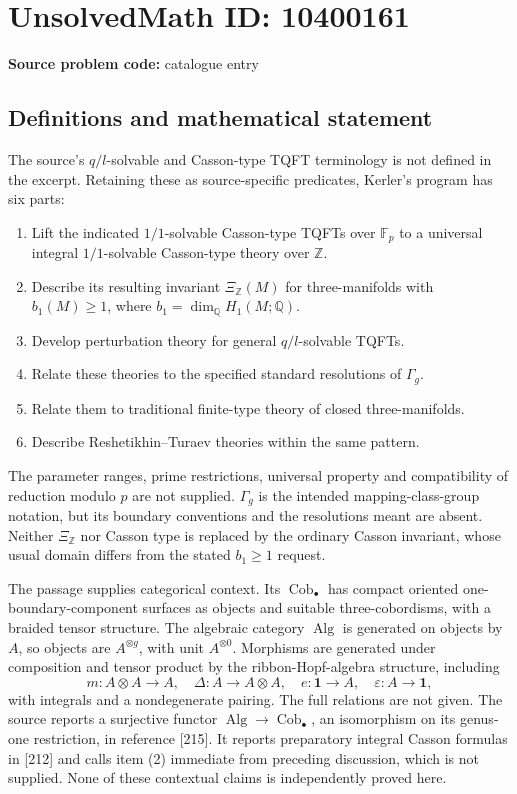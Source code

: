 \documentclass[11pt]{article}
\begin{document}
\section*{UnsolvedMath ID: 10400161}
\textbf{Source problem code:} catalogue entry
\subsection{Definitions and mathematical statement}
The source's \(q/l\)-solvable and Casson-type TQFT terminology is not defined in the excerpt. Retaining these as source-specific predicates, Kerler's program has six parts:
\begin{enumerate}
\item Lift the indicated \(1/1\)-solvable Casson-type TQFTs over \(\mathbb F_p\) to a universal integral \(1/1\)-solvable Casson-type theory over \(\mathbb Z\).
\item Describe its resulting invariant \(\Xi_{\mathbb Z}(M)\) for three-manifolds with \(b_1(M)\ge1\), where \(b_1=\dim_{\mathbb Q}H_1(M;\mathbb Q)\).
\item Develop perturbation theory for general \(q/l\)-solvable TQFTs.
\item Relate these theories to the specified standard resolutions of \(\Gamma_g\).
\item Relate them to traditional finite-type theory of closed three-manifolds.
\item Describe Reshetikhin--Turaev theories within the same pattern.
\end{enumerate}
The parameter ranges, prime restrictions, universal property and compatibility of reduction modulo \(p\) are not supplied. \(\Gamma_g\) is the intended mapping-class-group notation, but its boundary conventions and the resolutions meant are absent. Neither \(\Xi_{\mathbb Z}\) nor Casson type is replaced by the ordinary Casson invariant, whose usual domain differs from the stated \(b_1\ge1\) request.

The passage supplies categorical context. Its \(\operatorname{Cob}_\bullet\) has compact oriented one-boundary-component surfaces as objects and suitable three-cobordisms, with a braided tensor structure. The algebraic category \(\operatorname{Alg}\) is generated on objects by \(A\), so objects are \(A^{\otimes g}\), with unit \(A^{\otimes0}\). Morphisms are generated under composition and tensor product by the ribbon-Hopf-algebra structure, including
\[
 m:A\otimes A\to A,\quad\Delta:A\to A\otimes A,\quad
 e:\mathbf1\to A,\quad\varepsilon:A\to\mathbf1,
\]
with integrals and a nondegenerate pairing. The full relations are not given. The source reports a surjective functor \(\operatorname{Alg}\to\operatorname{Cob}_\bullet\), an isomorphism on its genus-one restriction, in reference [215]. It reports preparatory integral Casson formulas in [212] and calls item (2) immediate from preceding discussion, which is not supplied. None of these contextual claims is independently proved here.
\end{document}

